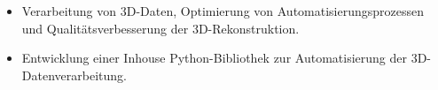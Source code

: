 \dottedline
{}
\begin{itemize}
\item Verarbeitung von 3D-Daten, Optimierung von Automatisierungsprozessen und Qualitätsverbesserung der 3D-Rekonstruktion.
\item Entwicklung einer Inhouse Python-Bibliothek zur Automatisierung der 3D-Datenverarbeitung.
\end{itemize}
